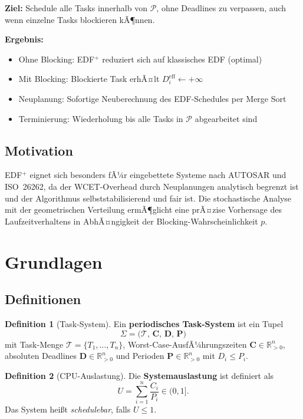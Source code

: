 ﻿\documentclass[a4paper,12pt]{article}
\theoremstyle{definition}
\newtheorem{definition}{Definition}
\begin{document}
	\textbf{Ziel:} Schedule alle Tasks innerhalb von $\mathcal{P}$, ohne Deadlines zu
	verpassen, auch wenn einzelne Tasks blockieren kÃ¶nnen.
	
	\textbf{Ergebnis:}
	\begin{itemize}
		\item Ohne Blocking: EDF$^+$ reduziert sich auf klassisches EDF (optimal)
		\item Mit Blocking: Blockierte Task erhÃ¤lt $D_i^{\text{eff}} \leftarrow +\infty$
		\item Neuplanung: Sofortige Neuberechnung des EDF-Schedules per Merge Sort
		\item Terminierung: Wiederholung bis alle Tasks in $\mathcal{P}$ abgearbeitet sind
	\end{itemize}
	
	\subsection{Motivation}
	
	EDF$^+$ eignet sich besonders fÃ¼r eingebettete Systeme nach AUTOSAR und
	ISO~26262, da der WCET-Overhead durch Neuplanungen analytisch begrenzt ist
	und der Algorithmus selbststabilisierend und fair ist. Die stochastische
	Analyse mit der geometrischen Verteilung ermÃ¶glicht eine prÃ¤zise Vorhersage
	des Laufzeitverhaltens in AbhÃ¤ngigkeit der Blocking-Wahrscheinlichkeit $p$.
	
	\section{Grundlagen}
	
	\subsection{Definitionen}
	
	\begin{definition}[Task-System]
		Ein \textbf{periodisches Task-System} ist ein Tupel
		\[
		\Sigma = \bigl(\mathcal{T},\, \mathbf{C},\, \mathbf{D},\, \mathbf{P}\bigr)
		\]
		mit Task-Menge $\mathcal{T} = \{T_1,\ldots,T_n\}$, Worst-Case-AusfÃ¼hrungszeiten
		$\mathbf{C} \in \mathbb{R}_{>0}^n$, absoluten Deadlines $\mathbf{D} \in \mathbb{R}_{>0}^n$
		und Perioden $\mathbf{P} \in \mathbb{R}_{>0}^n$ mit $D_i \le P_i$.
	\end{definition}
	
	\begin{definition}[CPU-Auslastung]
		Die \textbf{Systemauslastung} ist definiert als
		\[
		U = \sum_{i=1}^{n} \frac{C_i}{P_i} \in (0, 1].
		\]
		Das System hei\ss{}t \emph{schedulebar}, falls $U \le 1$.
	\end{definition}
	
\end{document}

